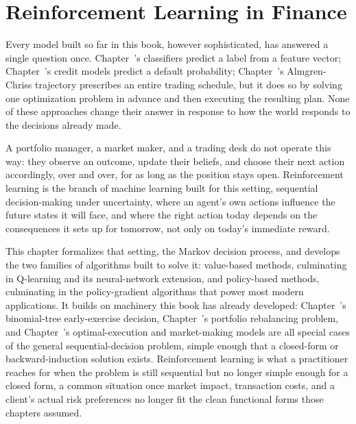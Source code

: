 \documentclass[../ai_in_finance]{subfiles}
\begin{document}
\chapter{Reinforcement Learning in Finance}

Every model built so far in this book, however sophisticated, has answered a single question once. Chapter~'s classifiers predict
a label from a feature vector; Chapter~'s credit models predict a default probability; Chapter~'s
Almgren-Chriss trajectory prescribes an entire trading schedule, but it does so by solving one
 optimization problem in advance and then executing the resulting plan. None of these approaches change their answer in
 response to how the world responds to the decisions already made.

A portfolio manager, a market maker, and a trading desk do not operate this way: they observe an outcome, update their beliefs,
and choose their next action accordingly, over and over, for as long as the position stays open. Reinforcement
learning is the branch of machine learning built for this setting,
sequential decision-making under uncertainty, where an agent's own actions influence the future states it will face,
and where the right action today depends on the consequences it sets up for tomorrow, not only on today's immediate reward.

This chapter formalizes that setting, the Markov decision process, and develops the two families of algorithms built to solve it: value-based methods, culminating in Q-learning and its neural-network extension, and policy-based methods, culminating in the policy-gradient algorithms that power most modern applications. It builds on machinery this book has already developed: Chapter~'s binomial-tree early-exercise decision, Chapter~'s portfolio rebalancing problem, and Chapter~'s optimal-execution and market-making models are all special cases of the general sequential-decision problem, simple enough that a closed-form or backward-induction solution exists. Reinforcement learning is what a practitioner reaches for when the problem is still sequential but no longer simple enough for a closed form, a common situation once market impact, transaction costs, and a client's actual risk preferences no longer fit the clean functional forms those chapters assumed.
\end{document}
